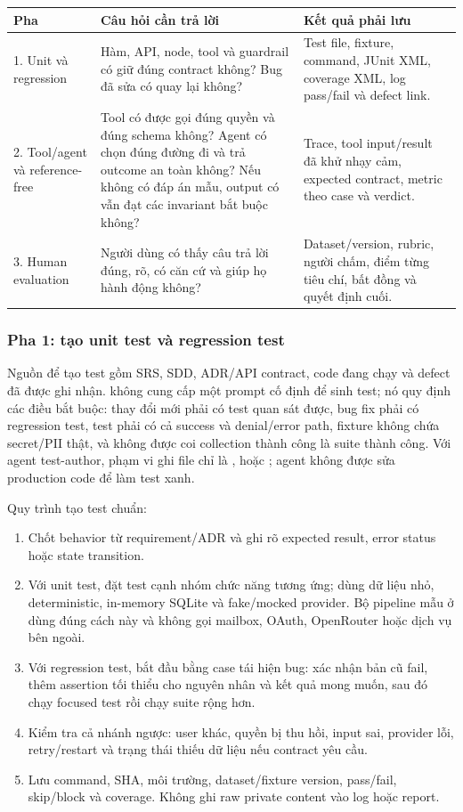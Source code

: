 \documentclass[12pt,a4paper]{article}
\begin{document}
\begin{longtable}{p{3.1cm}p{4.2cm}p{6cm}}
\toprule Pha & Câu hỏi cần trả lời & Kết quả phải lưu \\ \midrule\endhead
1. Unit và regression & Hàm, API, node, tool và guardrail có giữ đúng contract không? Bug đã sửa có quay lại không? & Test file, fixture, command, JUnit XML, coverage XML, log pass/fail và defect link. \\
2. Tool/agent và reference-free & Tool có được gọi đúng quyền và đúng schema không? Agent có chọn đúng đường đi và trả outcome an toàn không? Nếu không có đáp án mẫu, output có vẫn đạt các invariant bắt buộc không? & Trace, tool input/result đã khử nhạy cảm, expected contract, metric theo case và verdict. \\
3. Human evaluation & Người dùng có thấy câu trả lời đúng, rõ, có căn cứ và giúp họ hành động không? & Dataset/version, rubric, người chấm, điểm từng tiêu chí, bất đồng và quyết định cuối. \\
\bottomrule
\end{longtable}

\subsubsection{Pha 1: tạo unit test và regression test}
Nguồn để tạo test gồm SRS, SDD, ADR/API contract, code đang chạy và defect đã
được ghi nhận.  không cung cấp một prompt cố định để sinh test;
nó quy định các điều bắt buộc: thay đổi mới phải có test quan sát được, bug fix
phải có regression test, test phải có cả success và denial/error path, fixture
không chứa secret/PII thật, và không được coi collection thành công là suite
thành công. Với agent test-author, phạm vi ghi file chỉ là
,  hoặc ; agent
không được sửa production code để làm test xanh.

Quy trình tạo test chuẩn:

\begin{enumerate}
  \item Chốt behavior từ requirement/ADR và ghi rõ expected result, error
  status hoặc state transition.
  \item Với unit test, đặt test cạnh nhóm chức năng tương ứng; dùng dữ liệu
  nhỏ, deterministic, in-memory SQLite và fake/mocked provider. Bộ pipeline
  mẫu ở  dùng đúng cách này và không gọi
  mailbox, OAuth, OpenRouter hoặc dịch vụ bên ngoài.
  \item Với regression test, bắt đầu bằng case tái hiện bug: xác nhận bản cũ
  fail, thêm assertion tối thiểu cho nguyên nhân và kết quả mong muốn, sau đó
  chạy focused test rồi chạy suite rộng hơn.
  \item Kiểm tra cả nhánh ngược: user khác, quyền bị thu hồi, input sai,
  provider lỗi, retry/restart và trạng thái thiếu dữ liệu nếu contract yêu cầu.
  \item Lưu command, SHA, môi trường, dataset/fixture version, pass/fail,
  skip/block và coverage. Không ghi raw private content vào log hoặc report.
\end{enumerate}
\end{document}
